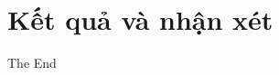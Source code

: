 \documentclass{beamer}
\begin{document}
\section{Kết quả và nhận xét}










\begin{frame}
\Huge{\centerline{The End}}
\end{frame}

\end{document}
